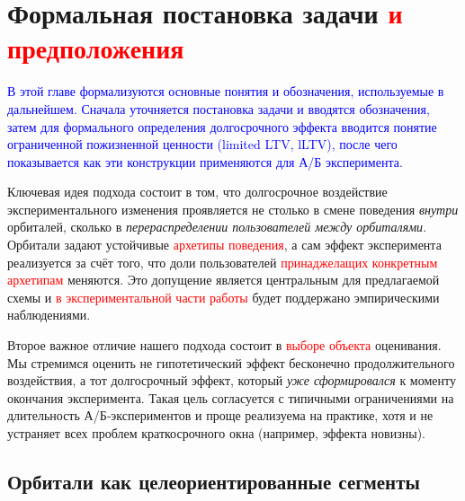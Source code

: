 \section{Формальная постановка задачи \textcolor{red}{и предположения}}
\label{sec:framework}

\textcolor{blue}{
В этой главе формализуются основные понятия и обозначения, используемые
в дальнейшем. Сначала
уточняется постановка задачи и вводятся обозначения,
затем для формального определения долгосрочного эффекта 
вводится понятие ограниченной пожизненной ценности (limited LTV, lLTV),
после чего показывается как эти конструкции 
применяются для А/Б эксперимента.}

Ключевая идея подхода состоит в том, что долгосрочное воздействие
экспериментального изменения проявляется не столько в смене поведения
\textit{внутри} орбиталей, сколько в \textit{перераспределении пользователей
между орбиталями}. Орбитали задают устойчивые \textcolor{red}{архетипы поведения}, а сам
эффект эксперимента реализуется за счёт того, что доли пользователей
\textcolor{red}{принаджелащих конкретным архетипам} меняются. Это допущение является центральным для
предлагаемой схемы и \textcolor{red}{в экспериментальной части работы} будет
поддержано эмпирическими наблюдениями.

Второе важное отличие нашего подхода состоит в \textcolor{red}{выборе объекта} оценивания.
Мы стремимся оценить не гипотетический эффект бесконечно продолжительного
воздействия, а тот долгосрочный эффект, который \textit{уже сформировался}
к моменту окончания эксперимента. Такая цель согласуется с типичными
ограничениями на длительность А/Б‑экспериментов и проще реализуема
на практике, хотя и не устраняет всех проблем краткосрочного окна
(например, эффекта новизны).

\subsection{Орбитали как целеориентированные сегменты}
\label{subsec:orbitals_def}

